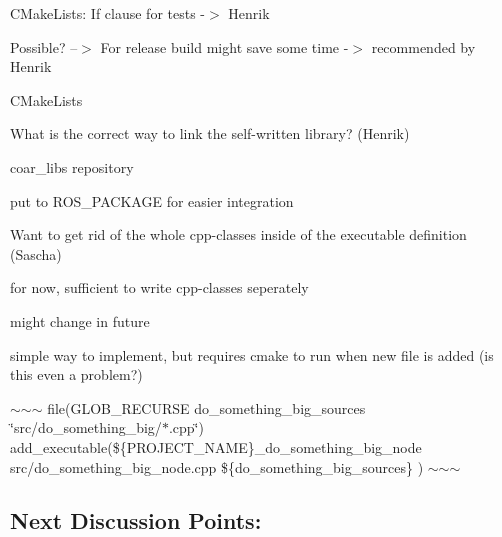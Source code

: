 \begin{DoxyEnumerate}
\item C\+Make\+Lists\+: If clause for tests -\/$>$ Henrik
\begin{DoxyItemize}
\item Possible? --$>$ For release build might save some time -\/$>$ recommended by Henrik
\end{DoxyItemize}
\end{DoxyEnumerate}
\begin{DoxyEnumerate}
\item C\+Make\+Lists
\begin{DoxyItemize}
\item What is the correct way to link the self-\/written library? (Henrik)
\begin{DoxyItemize}
\item coar\+\_\+libs repository
\item put to R\+O\+S\+\_\+\+P\+A\+C\+K\+A\+GE for easier integration
\end{DoxyItemize}
\item Want to get rid of the whole cpp-\/classes inside of the executable definition (Sascha)
\begin{DoxyItemize}
\item for now, sufficient to write cpp-\/classes seperately
\item might change in future
\item simple way to implement, but requires cmake to run when new file is added (is this even a problem?)
\end{DoxyItemize}

$\sim$$\sim$$\sim$ file(G\+L\+O\+B\+\_\+\+R\+E\+C\+U\+R\+SE do\+\_\+something\+\_\+big\+\_\+sources \char`\"{}src/do\+\_\+something\+\_\+big/$\ast$.\+cpp\char`\"{}) add\+\_\+executable(\$\{P\+R\+O\+J\+E\+C\+T\+\_\+\+N\+A\+ME\}\+\_\+do\+\_\+something\+\_\+big\+\_\+node src/do\+\_\+something\+\_\+big\+\_\+node.\+cpp \$\{do\+\_\+something\+\_\+big\+\_\+sources\} ) $\sim$$\sim$$\sim$ 


\end{DoxyItemize}
\end{DoxyEnumerate}

\subsection*{Next Discussion Points\+:}


